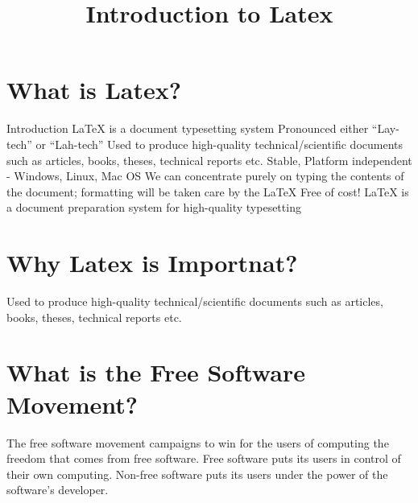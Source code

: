 \documentclass[12pt,a4paper]{article}
\begin{document}
\pagestyle{fancy}
\title{Introduction to Latex}
\fancyhf{} %
\fancyhead{} %
\fancyfoot{} %
\fancyfoot[R]{\thepage}
\maketitle
\section{What is Latex?}
Introduction
LaTeX is a document typesetting system
Pronounced either “Lay-tech” or “Lah-tech”
Used to produce high-quality technical/scientific documents
such as articles, books, theses, technical reports etc.
Stable, Platform independent - Windows, Linux, Mac OS
We can concentrate purely on typing the contents of the
document; formatting will be taken care by the LaTeX
Free of cost!
LaTeX is a document preparation system for high-quality typesetting
\section{Why Latex is Importnat?}
Used to produce high-quality technical/scientific documents
such as articles, books, theses, technical reports etc.
\section{What is the Free Software Movement?}
The free software movement campaigns to win for the users of computing the freedom 
that comes from free software. Free software puts its users in control of their own 
computing. Non-free software puts its users under the power of the software's developer. 
\\
\end{document}
